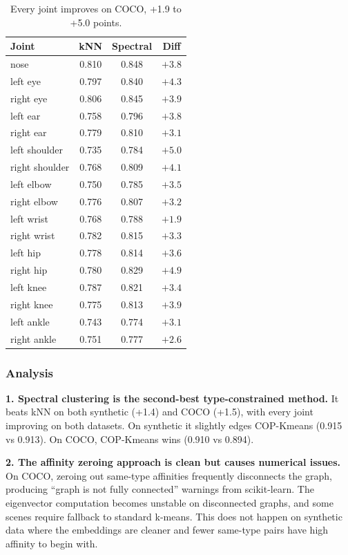\begin{table}[H]
\centering
\footnotesize
\begin{tabular}{lccc}
\toprule
Joint & kNN & Spectral & Diff \\
\midrule
nose & 0.810 & 0.848 & $+3.8$ \\
left eye & 0.797 & 0.840 & $+4.3$ \\
right eye & 0.806 & 0.845 & $+3.9$ \\
left ear & 0.758 & 0.796 & $+3.8$ \\
right ear & 0.779 & 0.810 & $+3.1$ \\
left shoulder & 0.735 & 0.784 & $+5.0$ \\
right shoulder & 0.768 & 0.809 & $+4.1$ \\
left elbow & 0.750 & 0.785 & $+3.5$ \\
right elbow & 0.776 & 0.807 & $+3.2$ \\
left wrist & 0.768 & 0.788 & $+1.9$ \\
right wrist & 0.782 & 0.815 & $+3.3$ \\
left hip & 0.778 & 0.814 & $+3.6$ \\
right hip & 0.780 & 0.829 & $+4.9$ \\
left knee & 0.787 & 0.821 & $+3.4$ \\
right knee & 0.775 & 0.813 & $+3.9$ \\
left ankle & 0.743 & 0.774 & $+3.1$ \\
right ankle & 0.751 & 0.777 & $+2.6$ \\
\bottomrule
\end{tabular}
\caption{Every joint improves on COCO, +1.9 to +5.0 points.}
\end{table}


\subsubsection{Analysis}

\textbf{1. Spectral clustering is the second-best type-constrained method.} It beats kNN on both synthetic (+1.4) and COCO (+1.5), with every joint improving on both datasets. On synthetic it slightly edges COP-Kmeans (0.915 vs 0.913). On COCO, COP-Kmeans wins (0.910 vs 0.894).

\textbf{2. The affinity zeroing approach is clean but causes numerical issues.} On COCO, zeroing out same-type affinities frequently disconnects the graph, producing ``graph is not fully connected'' warnings from scikit-learn. The eigenvector computation becomes unstable on disconnected graphs, and some scenes require fallback to standard k-means. This does not happen on synthetic data where the embeddings are cleaner and fewer same-type pairs have high affinity to begin with.

